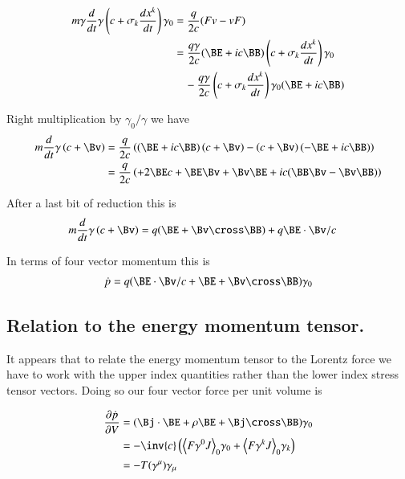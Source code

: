 \documentclass{article}
\begin{document}
\begin{align*}
m \gamma \frac{d}{dt} \gamma \left(c + \sigma_k \frac{dx^k}{dt}\right) \gamma_0
&= \frac{q}{2c}(F v - v F) \\
&=
\frac{q \gamma}{2c} 
(\BE + i c\BB) 
\left(c + \sigma_k \frac{dx^k}{dt}\right) \gamma_0
\\
&\quad -
\frac{q \gamma}{2c} 
\left(c + \sigma_k \frac{dx^k}{dt}\right) \gamma_0
(\BE + i c\BB) \\
\end{align*}

Right multiplication by $\gamma_0/\gamma$ we have
\begin{align*}
m \frac{d}{dt} \gamma \left(c + \Bv \right) 
&= \frac{q }{2c} \left( (\BE + i c\BB) \left(c + \Bv \right) -\left(c + \Bv \right) (-\BE + i c\BB) \right) \\
&= \frac{q }{2c} \left( 
+ 2 \BE c 
+ \BE \Bv  + \Bv \BE 
+ i c (\BB \Bv  - \Bv \BB)
\right) \\
\end{align*}

After a last bit of reduction this is
\begin{align}
m \frac{d}{dt} \gamma \left(c + \Bv \right) &= q (\BE + \Bv \cross \BB) + q \BE \cdot \Bv/c
\end{align}

In terms of four vector momentum this is
\begin{align}\label{eqn:lorentzForceVec}
\dot{p} = q ( \BE \cdot \Bv/c + \BE + \Bv \cross \BB ) \gamma_0
\end{align}

\subsection{ Relation to the energy momentum tensor. }

It appears that to relate the energy momentum tensor to the Lorentz force we have 
to work with the upper index quantities rather than the lower index stress tensor vectors.  Doing so
our four vector force per unit volume is
 
\begin{align}
\PD{V}{\dot{p}}
&= (\Bj \cdot \BE + \rho \BE + \Bj \cross \BB) \gamma_0 \\
&= - \inv{c} \left(\gpgradezero{ F \gamma^0 J } \gamma_0 + \gpgradezero{ F \gamma^k J } \gamma_k \right) \\
&= - T(\gamma^\mu) \gamma_\mu
\end{align}
\end{document}
